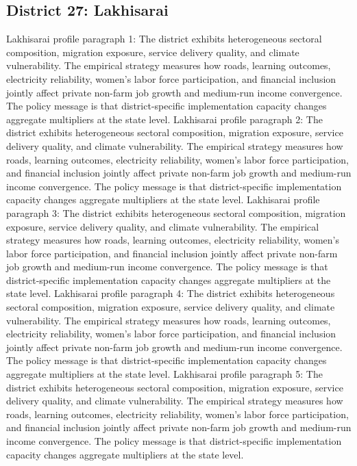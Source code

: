 \documentclass[preprint,12pt]{elsarticle}
\begin{document}
\subsection{District 27: Lakhisarai}
Lakhisarai profile paragraph 1: The district exhibits heterogeneous sectoral composition, migration exposure, service delivery quality, and climate vulnerability. The empirical strategy measures how roads, learning outcomes, electricity reliability, women's labor force participation, and financial inclusion jointly affect private non-farm job growth and medium-run income convergence. The policy message is that district-specific implementation capacity changes aggregate multipliers at the state level.
Lakhisarai profile paragraph 2: The district exhibits heterogeneous sectoral composition, migration exposure, service delivery quality, and climate vulnerability. The empirical strategy measures how roads, learning outcomes, electricity reliability, women's labor force participation, and financial inclusion jointly affect private non-farm job growth and medium-run income convergence. The policy message is that district-specific implementation capacity changes aggregate multipliers at the state level.
Lakhisarai profile paragraph 3: The district exhibits heterogeneous sectoral composition, migration exposure, service delivery quality, and climate vulnerability. The empirical strategy measures how roads, learning outcomes, electricity reliability, women's labor force participation, and financial inclusion jointly affect private non-farm job growth and medium-run income convergence. The policy message is that district-specific implementation capacity changes aggregate multipliers at the state level.
Lakhisarai profile paragraph 4: The district exhibits heterogeneous sectoral composition, migration exposure, service delivery quality, and climate vulnerability. The empirical strategy measures how roads, learning outcomes, electricity reliability, women's labor force participation, and financial inclusion jointly affect private non-farm job growth and medium-run income convergence. The policy message is that district-specific implementation capacity changes aggregate multipliers at the state level.
Lakhisarai profile paragraph 5: The district exhibits heterogeneous sectoral composition, migration exposure, service delivery quality, and climate vulnerability. The empirical strategy measures how roads, learning outcomes, electricity reliability, women's labor force participation, and financial inclusion jointly affect private non-farm job growth and medium-run income convergence. The policy message is that district-specific implementation capacity changes aggregate multipliers at the state level.
\end{document}
